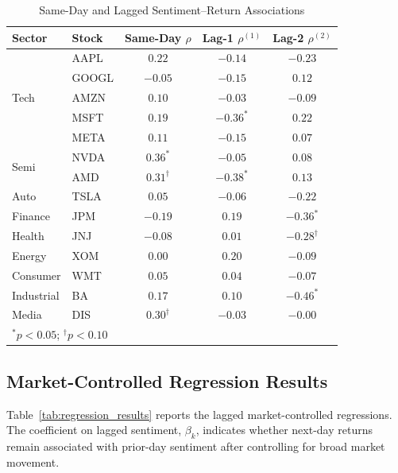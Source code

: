 \documentclass[lettersize,journal]{IEEEtran}
\begin{document}
\begin{table}[!htbp]
\centering
\caption{Same-Day and Lagged Sentiment--Return Associations}
\label{tab:lagged_results}
\begin{tabular}{llccc}
\toprule
\textbf{Sector} & \textbf{Stock} & \textbf{Same-Day $\rho$} & \textbf{Lag-1 $\rho^{(1)}$} & \textbf{Lag-2 $\rho^{(2)}$} \\
\midrule
\multirow{5}{*}{Tech}  & AAPL  & $0.22$ & $-0.14$ & $-0.23$ \\
                        & GOOGL & $-0.05$ & $-0.15$ & $0.12$ \\
                        & AMZN  & $0.10$ & $-0.03$ & $-0.09$ \\
                        & MSFT  & $0.19$ & $-0.36^{*}$ & $0.22$ \\
                        & META  & $0.11$ & $-0.15$ & $0.07$ \\
\midrule
\multirow{2}{*}{Semi}  & NVDA  & $0.36^{*}$ & $-0.05$ & $0.08$ \\
                        & AMD   & $0.31^{\dagger}$ & $-0.38^{*}$ & $0.13$ \\
\midrule
Auto   & TSLA  & $0.05$ & $-0.06$ & $-0.22$ \\
\midrule
Finance & JPM  & $-0.19$ & $0.19$ & $-0.36^{*}$ \\
\midrule
Health & JNJ   & $-0.08$ & $0.01$ & $-0.28^{\dagger}$ \\
\midrule
Energy & XOM   & $0.00$ & $0.20$ & $-0.09$ \\
\midrule
Consumer & WMT & $0.05$ & $0.04$ & $-0.07$ \\
\midrule
Industrial & BA & $0.17$ & $0.10$ & $-0.46^{*}$ \\
\midrule
Media  & DIS   & $0.30^{\dagger}$ & $-0.03$ & $-0.00$ \\
\bottomrule
\multicolumn{5}{l}{\small $^{*}p < 0.05$; $^{\dagger}p < 0.10$}
\end{tabular}
\end{table}


\subsection{Market-Controlled Regression Results}
Table~\ref{tab:regression_results} reports the lagged market-controlled regressions. The coefficient on lagged sentiment, $\beta_k$, indicates whether next-day returns remain associated with prior-day sentiment after controlling for broad market movement.
\end{document}
